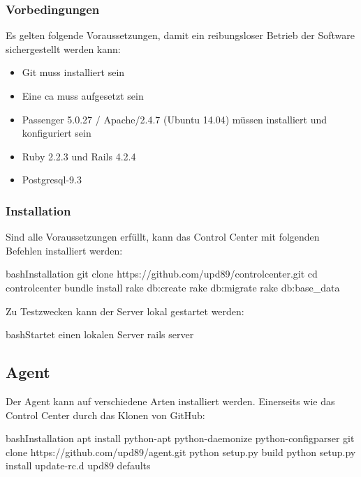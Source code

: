 \subsubsection*{Vorbedingungen}

Es gelten folgende Voraussetzungen, damit ein reibungsloser Betrieb der Software sichergestellt werden kann:

\begin{itemize}
    \item Git muss installiert sein
    \item Eine \gls{ca} muss aufgesetzt sein
    \item Passenger 5.0.27 / Apache/2.4.7 (Ubuntu 14.04) müssen installiert und konfiguriert sein
    \item Ruby 2.2.3 und Rails 4.2.4
    \item Postgresql-9.3
\end{itemize}


\subsubsection*{Installation}

Sind alle Voraussetzungen erfüllt, kann das Control Center mit folgenden Befehlen installiert werden:

\begin{srclst}[label=lst:cc:installation]{bash}{Installation}
git clone https://github.com/upd89/controlcenter.git
cd controlcenter
bundle install
rake db:create
rake db:migrate
rake db:base_data
\end{srclst}

Zu Testzwecken kann der Server lokal gestartet werden:

\begin{srclst}[label=lst:cc:localtest]{bash}{Startet einen lokalen Server}
rails server
\end{srclst}


\subsection*{Agent}

Der Agent kann auf verschiedene Arten installiert werden. Einerseits wie das Control Center durch das Klonen von GitHub:

\begin{srclst}[label=lst:agent:installation]{bash}{Installation}
apt install python-apt python-daemonize python-configparser
git clone https://github.com/upd89/agent.git
python setup.py build
python setup.py install
update-rc.d upd89 defaults
\end{srclst}

